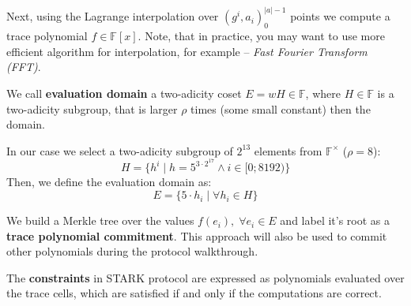 \documentclass[../lecture-notes.tex]{subfiles}
\begin{document}
Next, using the Lagrange interpolation over $(g^i, a_i)_0^{|a| - 1}$ points we compute a trace polynomial $f \in \mathbb{F}[x]$. Note, that in practice, you may want to use more efficient algorithm for interpolation, for example -- \textit{Fast Fourier Transform (FFT)}.

\begin{definition}
We call \textbf{evaluation domain} a two-adicity coset $E = wH\in \mathbb{F}$, where $H \in \mathbb{F}$ is a two-adicity subgroup, that is larger $\rho$ times (some small constant) then the domain. 
\end{definition}

\begin{example}
In our case we select a two-adicity subgroup of $2^{13}$ elements from $\mathbb{F}^\times$ ($\rho = 8$): 
\begin{equation*}
H = \{h^i \;|\; h = 5^{3\cdot 2^{17}} \land i \in [0;8192) \}
\end{equation*}
Then, we define the evaluation domain as:
\begin{equation*}
E = \{5\cdot h_i \;|\; \forall h_i \in H\}  
\end{equation*}
\end{example}

We build a Merkle tree over the values $f(e_i),\; \forall e_i \in E$ and label it's root as a \textbf{trace polynomial commitment}. This approach will also be used to commit other polynomials during the protocol walkthrough.

The \textbf{constraints} in STARK protocol are expressed as polynomials evaluated over the trace cells, which are satisfied if and only if the computations are correct.
\end{document}
